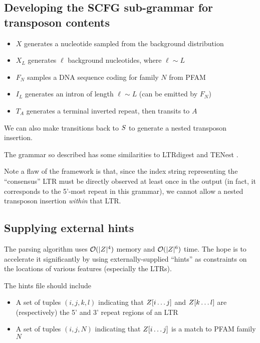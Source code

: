 \documentclass[10pt]{article}
\begin{document}
\subsection{Developing the SCFG sub-grammar for transposon contents}

\begin{itemize}
\item $X$ generates a nucleotide sampled from the background distribution
\item $X_L$ generates $\ell$ background nucleotides, where $\ell \sim L$
\item $F_N$ samples a DNA sequence coding for family $N$ from PFAM \cite{Pfam2008}
\item $I_L$ generates an intron of length $\ell \sim L$ (can be emitted by $F_N$)
\item $T_A$ generates a terminal inverted repeat, then transits to $A$
\end{itemize}
We can also make transitions back to $S$ to generate a nested transposon insertion.

The grammar so described has some similarities to LTRdigest \cite{pmid19786494} and TENest \cite{KronmillerWise2008}.

Note a flaw of the framework is that, since the index string representing the ``consensus'' LTR must be directly observed at least once in the output
(in fact, it corresponds to the 5'-most repeat in this grammar), 
we cannot allow a nested transposon insertion {\em within} that LTR.


\subsection{Supplying external hints}

The parsing algorithm uses ${\cal O}(|Z|^4)$ memory and ${\cal O}(|Z|^6)$ time.
The hope is to accelerate it significantly by using externally-supplied ``hints''
as constraints on the locations of various features (especially the LTRs).

The hints file should include
\begin{itemize}
\item A set of tuples $(i,j,k,l)$ indicating that $Z[i \ldots j]$ and $Z[k \ldots l]$ are (respectively) the 5' and 3' repeat regions of an LTR
\item A set of tuples $(i,j,N)$ indicating that $Z[i \ldots j]$ is a match to PFAM family $N$
\end{itemize}
\end{document}
